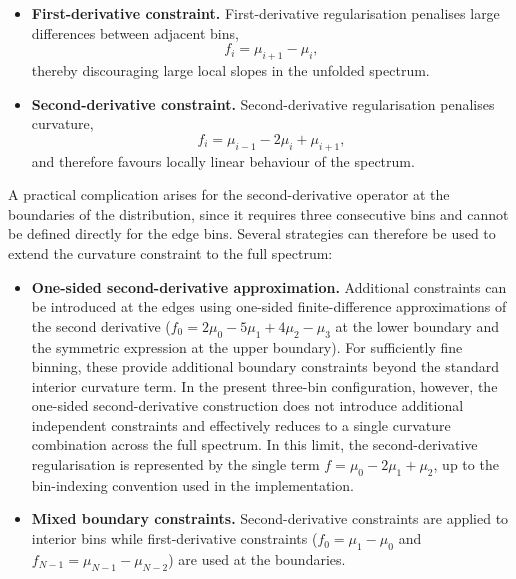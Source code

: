 \begin{itemize}

\item \textbf{First-derivative constraint.}  
First-derivative regularisation penalises large differences between adjacent bins,
\begin{equation}
f_i = \mu_{i+1}-\mu_i ,
\end{equation}
thereby discouraging large local slopes in the unfolded spectrum.

\item \textbf{Second-derivative constraint.}  
Second-derivative regularisation penalises curvature,
\begin{equation}
f_i = \mu_{i-1}-2\mu_i+\mu_{i+1},
\end{equation}
and therefore favours locally linear behaviour of the spectrum.  
\end{itemize}

A practical complication arises for the second-derivative operator at the boundaries of the distribution, since it requires three consecutive bins and cannot be defined directly for the edge bins. 
Several strategies can therefore be used to extend the curvature constraint to the full spectrum:

\begin{itemize}

\item \textbf{One-sided second-derivative approximation.}  
Additional constraints can be introduced at the edges using one-sided finite-difference approximations of the second derivative ($f_0 = 2\mu_0 -5\mu_1 +4\mu_2 -\mu_3$ at the lower boundary and the symmetric expression at the upper boundary). 
For sufficiently fine binning, these provide additional boundary constraints beyond the standard interior curvature term. 
In the present three-bin configuration, however, the one-sided second-derivative construction does not introduce additional independent constraints and effectively reduces to a single curvature combination across the full spectrum. 
In this limit, the second-derivative regularisation is represented by the single term $f = \mu_0 - 2\mu_1 + \mu_2$, up to the bin-indexing convention used in the implementation.

\item \textbf{Mixed boundary constraints.}  
Second-derivative constraints are applied to interior bins while first-derivative constraints ($f_0=\mu_1-\mu_0$ and $f_{N-1}=\mu_{N-1}-\mu_{N-2}$) are used at the boundaries.

\end{itemize}

